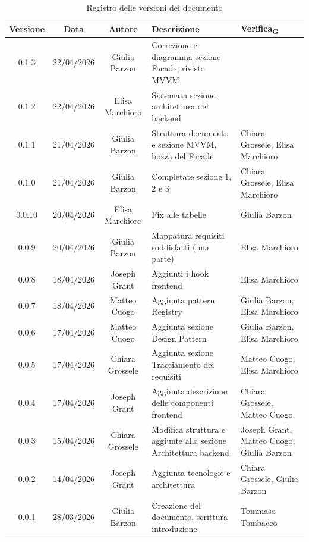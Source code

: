 \documentclass[11pt,a4paper]{article}
\newcommand{\gls}[1]{#1\textsubscript{G}}
\begin{document}
\begin{table}[H]
    \centering          
    \begin{tabular}{|c|c|c|>{\raggedright\arraybackslash}p{}|p{}|}
        \hline
        \textbf{Versione} & \textbf{Data} & \textbf{Autore} & \textbf{Descrizione} & \textbf{\gls{Verifica}} \\
        \hline
        0.1.3 & 22/04/2026 & Giulia Barzon & Correzione e diagramma sezione Facade, rivisto MVVM & \\
        \hline
        0.1.2 & 22/04/2026 & Elisa Marchioro & Sistemata sezione architettura del backend & \\
        \hline
        0.1.1 & 21/04/2026 & Giulia Barzon & Struttura documento e sezione MVVM, bozza del Facade & Chiara Grossele, Elisa Marchioro\\
        \hline
        0.1.0 & 21/04/2026 & Giulia Barzon & Completate sezione 1, 2 e 3 & Chiara Grossele, Elisa Marchioro\\
        \hline
        0.0.10 & 20/04/2026 & Elisa Marchioro & Fix alle tabelle & Giulia Barzon\\
        \hline
        0.0.9 & 20/04/2026 & Giulia Barzon & Mappatura requisiti soddisfatti (una parte) & Elisa Marchioro\\
        \hline
        0.0.8 & 18/04/2026 & Joseph Grant & Aggiunti i hook frontend & Elisa Marchioro\\
        \hline
        0.0.7 & 18/04/2026 & Matteo Cuogo & Aggiunta pattern Registry & Giulia Barzon, Elisa Marchioro\\
        \hline
        0.0.6 & 17/04/2026 & Matteo Cuogo & Aggiunta sezione Design Pattern & Giulia Barzon, Elisa Marchioro\\
        \hline
        0.0.5 & 17/04/2026 & Chiara Grossele & Aggiunta sezione Tracciamento dei requisiti & Matteo Cuogo, Elisa Marchioro\\
        \hline
        0.0.4 & 17/04/2026 & Joseph Grant & Aggiunta descrizione delle componenti frontend & Chiara Grossele, Matteo Cuogo\\
        \hline
        0.0.3 & 15/04/2026 & Chiara Grossele & Modifica struttura e aggiunte alla sezione Architettura backend & Joseph Grant, Matteo Cuogo, Giulia Barzon \\
        \hline
        0.0.2 & 14/04/2026 & Joseph Grant & Aggiunta tecnologie e architettura & Chiara Grossele, Giulia Barzon\\
        \hline
        0.0.1 & 28/03/2026 & Giulia Barzon & Creazione del documento, scrittura introduzione & Tommaso Tombacco \\
        \hline
    \end{tabular}
    \caption{Registro delle versioni del documento}
    \label{tab:versionamento}
\end{table}
\newpage
\end{document}
